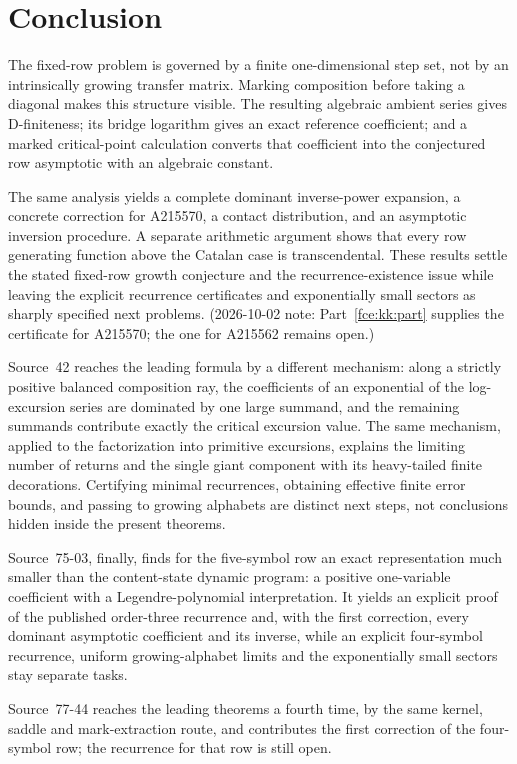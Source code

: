 \documentclass[11pt,a4paper]{article}
\numberwithin{equation}{section}
\theoremstyle{definition}\newtheorem{definition}[theorem]{Definition}
\theoremstyle{remark}\newtheorem{remark}[theorem]{Remark}
\begin{document}
\section{Conclusion}
The fixed-row problem is governed by a finite one-dimensional step set,
not by an intrinsically growing transfer matrix. Marking composition
before taking a diagonal makes this structure visible. The resulting
algebraic ambient series gives D-finiteness; its bridge logarithm gives
an exact reference coefficient; and a marked critical-point calculation
converts that coefficient into the conjectured row asymptotic with an
algebraic constant.

The same analysis yields a complete dominant inverse-power expansion,
a concrete correction for A215570, a contact distribution, and an
asymptotic inversion procedure. A separate arithmetic argument shows
that every row generating function above the Catalan case is
transcendental. These results settle the stated fixed-row growth
conjecture and the recurrence-existence issue while leaving the explicit
recurrence certificates and exponentially small sectors as sharply
specified next problems. (2026-10-02 note: Part~\ref{fce:kk:part} supplies
the certificate for A215570; the one for A215562 remains open.)

Source~42 reaches the leading formula by a different mechanism: along a
strictly positive balanced composition ray, the coefficients of an
exponential of the log-excursion series are dominated by one large
summand, and the remaining summands contribute exactly the critical
excursion value. The same mechanism, applied to the factorization into
primitive excursions, explains the limiting number of returns and the
single giant component with its heavy-tailed finite decorations.
Certifying minimal recurrences, obtaining effective finite error bounds,
and passing to growing alphabets are distinct next steps, not conclusions
hidden inside the present theorems.

Source~75-03, finally, finds for the five-symbol row an exact
representation much smaller than the content-state dynamic program: a
positive one-variable coefficient with a Legendre-polynomial
interpretation. It yields an explicit proof of the published order-three
recurrence and, with the first correction, every dominant asymptotic
coefficient and its inverse, while an explicit four-symbol recurrence,
uniform growing-alphabet limits and the exponentially small sectors stay
separate tasks.

Source~77-44 reaches the leading theorems a fourth time, by the same
kernel, saddle and mark-extraction route, and contributes the first
correction of the four-symbol row; the recurrence for that row is still
open.
\end{document}
